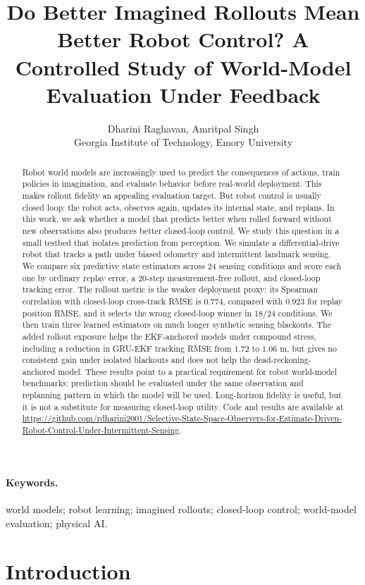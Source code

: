 \documentclass{article}
\title{Do Better Imagined Rollouts Mean Better Robot Control? A Controlled Study of World-Model Evaluation Under Feedback}
\author{
  Dharini Raghavan, Amritpal Singh \\
  Georgia Institute of Technology, Emory University 
}
\begin{document}
\maketitle

\begin{abstract}
Robot world models are increasingly used to predict the consequences of actions, train policies in imagination, and evaluate behavior before real-world deployment. This makes rollout fidelity an appealing evaluation target. But robot control is usually closed loop: the robot acts, observes again, updates its internal state, and replans. In this work, we ask whether a model that predicts better when rolled forward without new observations also produces better closed-loop control. We study this question in a small testbed that isolates prediction from perception. We simulate a differential-drive robot that tracks a path under biased odometry and intermittent landmark sensing. We compare six predictive state estimators across 24 sensing conditions and score each one by ordinary replay error, a 20-step measurement-free rollout, and closed-loop tracking error. The rollout metric is the weaker deployment proxy: its Spearman correlation with closed-loop cross-track RMSE is $0.774$, compared with $0.923$ for replay position RMSE, and it selects the wrong closed-loop winner in 18/24 conditions. We then train three learned estimators on much longer synthetic sensing blackouts. The added rollout exposure helps the EKF-anchored models under compound stress, including a reduction in GRU-EKF tracking RMSE from $1.72$ to $1.06$ m, but gives no consistent gain under isolated blackouts and does not help the dead-reckoning-anchored model. These results point to a practical requirement for robot world-model benchmarks: prediction should be evaluated under the same observation and replanning pattern in which the model will be used. Long-horizon fidelity is useful, but it is not a substitute for measuring closed-loop utility. Code and results are available at \url{https://github.com/rdharini2001/Selective-State-Space-Observers-for-Estimate-Driven-Robot-Control-Under-Intermittent-Sensing}.
\end{abstract}

\paragraph{Keywords.} world models; robot learning; imagined rollouts; closed-loop control; world-model evaluation; physical AI.

\section{Introduction}
\end{document}
